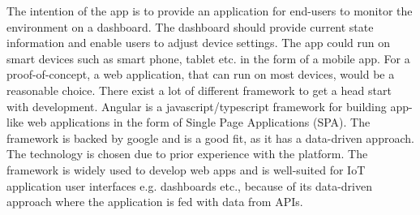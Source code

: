 The intention of the app is to provide an application for end-users to monitor the environment on a dashboard. The dashboard should provide current state information and enable users to adjust device settings. The app could run on smart devices such as smart phone, tablet etc. in the form of a mobile app. For a proof-of-concept, a web application, that can run on most devices, would be a reasonable choice. There exist a lot of different framework to get a head start with development.  Angular \cite{angular} is a javascript/typescript framework for building app-like web applications in the form of Single Page Applications (SPA). The framework is backed by google and is a good fit, as it has a data-driven approach. The technology is chosen due to prior experience with the platform. The framework is widely used to develop web apps and is well-suited for IoT application user interfaces e.g. dashboards etc., because of its data-driven approach where the application is fed with data from APIs.